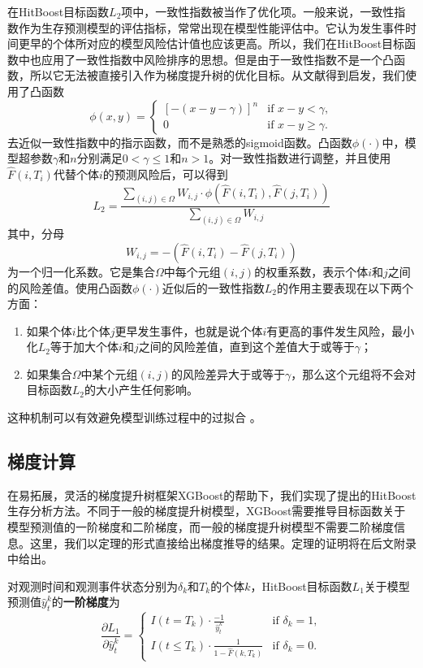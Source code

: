 在HitBoost目标函数$L_2$项中，一致性指数被当作了优化项。一般来说，一致性指数作为生存预测模型的评估指标，常常出现在模型性能评估中。它认为发生事件时间更早的个体所对应的模型风险估计值也应该更高。所以，我们在HitBoost目标函数中也应用了一致性指数中风险排序的思想。但是由于一致性指数不是一个凸函数，所以它无法被直接引入作为梯度提升树的优化目标。从文献\cite{Yan2004pre}得到启发，我们使用了凸函数$$
\phi(x,y)=
\begin{cases}
{[-(x-y-\gamma)]}^n & \text{if } x-y < \gamma,\\
0 & \text{if } x-y \ge \gamma.
\end{cases}
$$
去近似一致性指数中的指示函数，而不是熟悉的sigmoid函数。凸函数$\phi(\cdot)$中，模型超参数$\gamma$和$n$分别满足$0<\gamma \le 1$和$n>1$。对一致性指数进行调整，并且使用$\hat{F}(i, T_i)$代替个体$i$的预测风险后，可以得到$$
L_2 = \frac{\sum_{(i,j)\in \Omega} W_{i,j}\cdot \phi(\hat{F}(i, T_i), \hat{F}(j, T_i))}{\sum_{(i,j)\in \Omega} W_{i,j}}
$$
其中，分母$$
W_{i,j}=-\left( \hat{F}(i, T_i) - \hat{F}(j, T_i) \right)
$$
为一个归一化系数。它是集合$\Omega$中每个元组$(i,j)$的权重系数，表示个体$i$和$j$之间的风险差值。使用凸函数$\phi(\cdot)$近似后的一致性指数$L_2$的作用主要表现在以下两个方面：
\begin{enumerate}
    \item 如果个体$i$比个体$j$更早发生事件，也就是说个体$i$有更高的事件发生风险，最小化$L_2$等于加大个体$i$和$j$之间的风险差值，直到这个差值大于或等于$\gamma$；
    \item 如果集合$\Omega$中某个元组$(i,j)$的风险差异大于或等于$\gamma$，那么这个元组将不会对目标函数$L_2$的大小产生任何影响。
\end{enumerate}
这种机制可以有效避免模型训练过程中的过拟合 。

\subsection{梯度计算}

在易拓展，灵活的梯度提升树框架XGBoost的帮助下，我们实现了提出的HitBoost生存分析方法。不同于一般的梯度提升树模型，XGBoost需要推导目标函数关于模型预测值的一阶梯度和二阶梯度，而一般的梯度提升树模型不需要二阶梯度信息。这里，我们以定理的形式直接给出梯度推导的结果。定理的证明将在后文附录中给出。

\begin{theorem}\label{thm:1.1}
对观测时间和观测事件状态分别为$\delta_k$和$T_k$的个体$k$，HitBoost目标函数$L_1$关于模型预测值$\hat{y}_t^k$的\textbf{一阶梯度}为$$
\frac{\partial L_1}{\partial \hat{y}_t^k}=
\begin{cases}
I(t=T_k)\cdot \frac{-1}{\hat{y}_t^k} & \text{if } \delta_k = 1,\\
I(t\le T_k)\cdot \frac{1}{1-\hat{F}(k, T_k)} & \text{if } \delta_k = 0.
\end{cases}
$$
\end{theorem}

